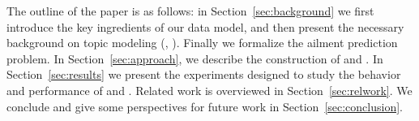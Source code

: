The outline of the paper is as follows: in
Section~\ref{sec:background} we first introduce the key ingredients of 
our data model, and then present the necessary background on
topic modeling (\lda, \atam). Finally we formalize the ailment prediction
problem. In Section~\ref{sec:approach}, we describe the construction of \tmatam and \tatam.
In Section~\ref{sec:results} we present the experiments designed to study
the behavior and performance of \tmatam and \tatam. Related work is overviewed in 
Section~\ref{sec:relwork}. We conclude and give some perspectives for 
future work in Section~\ref{sec:conclusion}.
